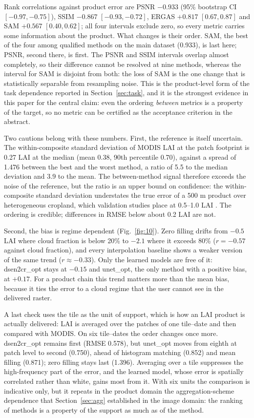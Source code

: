 \documentclass[a4paper,fleqn]{cas-dc}
\begin{document}
Rank correlations against product error are PSNR $-0.933$ (95\% bootstrap CI $[-0.97,-0.75]$), SSIM $-0.867$ $[-0.93,-0.72]$, ERGAS $+0.817$ $[0.67,0.87]$ and SAM $+0.567$ $[0.40,0.62]$; all four intervals exclude zero, so every metric carries some information about the product. What changes is their order. SAM, the best of the four among qualified methods on the main dataset (0.933), is last here; PSNR, second there, is first. The PSNR and SSIM intervals overlap almost completely, so their difference cannot be resolved at nine methods, whereas the interval for SAM is disjoint from both: the loss of SAM is the one change that is statistically separable from resampling noise. This is the product-level form of the task dependence reported in Section~\ref{sec:task}, and it is the strongest evidence in this paper for the central claim: even the ordering \emph{between} metrics is a property of the target, so no metric can be certified as the acceptance criterion in the abstract.

Two cautions belong with these numbers. First, the reference is itself uncertain. The within-composite standard deviation of MODIS LAI at the patch footprint is 0.27 LAI at the median (mean 0.38, 90th percentile 0.70), against a spread of 1.476 between the best and the worst method, a ratio of 5.5 to the median deviation and 3.9 to the mean. The between-method signal therefore exceeds the noise of the reference, but the ratio is an upper bound on confidence: the within-composite standard deviation understates the true error of a 500 m product over heterogeneous cropland, which validation studies place at 0.5--1.0 LAI \cite{ref43}. The ordering is credible; differences in RMSE below about 0.2 LAI are not.

Second, the bias is regime dependent (Fig.~\ref{fig:10}). Zero filling drifts from $-0.5$ LAI where cloud fraction is below 20\% to $-2.1$ where it exceeds 80\% ($r=-0.57$ against cloud fraction), and every interpolation baseline shows a weaker version of the same trend ($r\approx-0.33$). Only the learned models are free of it: dsen2cr\_opt stays at $-0.15$ and unet\_opt, the only method with a positive bias, at $+0.17$. For a product chain this trend matters more than the mean bias, because it ties the error to a cloud regime that the user cannot see in the delivered raster.

A last check uses the tile as the unit of support, which is how an LAI product is actually delivered: LAI is averaged over the patches of one tile--date and then compared with MODIS. On six tile--dates the order changes once more. dsen2cr\_opt remains first (RMSE 0.578), but unet\_opt moves from eighth at patch level to second (0.750), ahead of histogram matching (0.852) and mean filling (0.871); zero filling stays last (1.396). Averaging over a tile suppresses the high-frequency part of the error, and the learned model, whose error is spatially correlated rather than white, gains most from it. With six units the comparison is indicative only, but it repeats in the product domain the aggregation-scheme dependence that Section~\ref{sec:agg} established in the image domain: the ranking of methods is a property of the support as much as of the method.
\end{document}
